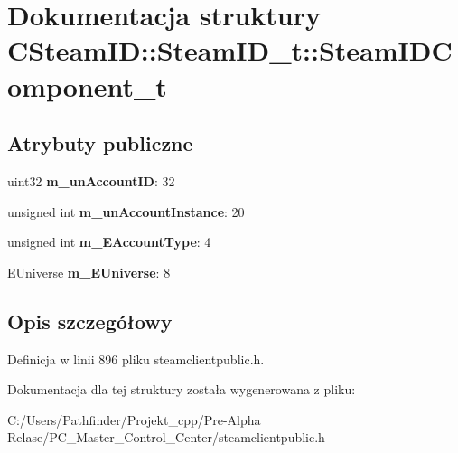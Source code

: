 \hypertarget{struct_c_steam_i_d_1_1_steam_i_d__t_1_1_steam_i_d_component__t}{}\section{Dokumentacja struktury C\+Steam\+ID\+:\+:Steam\+I\+D\+\_\+t\+:\+:Steam\+I\+D\+Component\+\_\+t}
\label{struct_c_steam_i_d_1_1_steam_i_d__t_1_1_steam_i_d_component__t}
\subsection*{Atrybuty publiczne}
\begin{DoxyCompactItemize}
\item 
\mbox{\label{struct_c_steam_i_d_1_1_steam_i_d__t_1_1_steam_i_d_component__t_a475adb618e46a2ef15d7d56878622763}} 
uint32 {\bfseries m\+\_\+un\+Account\+ID}\+: 32
\item 
\mbox{\label{struct_c_steam_i_d_1_1_steam_i_d__t_1_1_steam_i_d_component__t_a4a717deb712fb5997a758c2140a6fc14}} 
unsigned int {\bfseries m\+\_\+un\+Account\+Instance}\+: 20
\item 
\mbox{\label{struct_c_steam_i_d_1_1_steam_i_d__t_1_1_steam_i_d_component__t_a8fdc153414218d0f9d3b4213b199d089}} 
unsigned int {\bfseries m\+\_\+\+E\+Account\+Type}\+: 4
\item 
\mbox{\label{struct_c_steam_i_d_1_1_steam_i_d__t_1_1_steam_i_d_component__t_a2ad40ea35f1166ba6f7579ae664cedda}} 
E\+Universe {\bfseries m\+\_\+\+E\+Universe}\+: 8
\end{DoxyCompactItemize}


\subsection{Opis szczegółowy}


Definicja w linii 896 pliku steamclientpublic.\+h.



Dokumentacja dla tej struktury została wygenerowana z pliku\+:\begin{DoxyCompactItemize}
\item 
C\+:/\+Users/\+Pathfinder/\+Projekt\+\_\+cpp/\+Pre-\/\+Alpha Relase/\+P\+C\+\_\+\+Master\+\_\+\+Control\+\_\+\+Center/steamclientpublic.\+h\end{DoxyCompactItemize}
